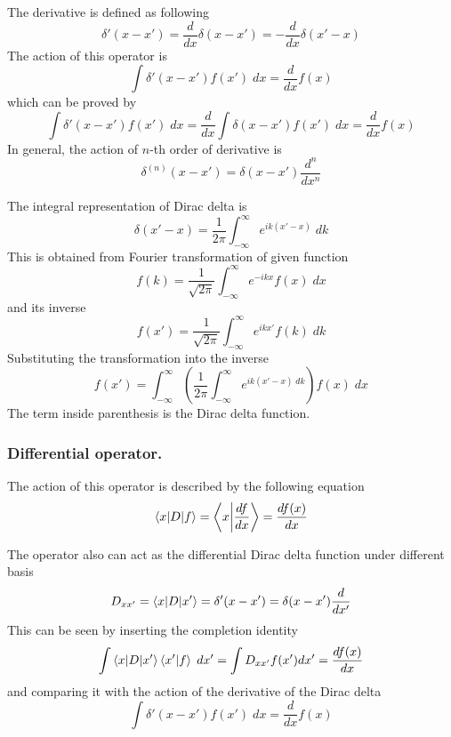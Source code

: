 \documentclass[../main.tex]{subfiles}
\begin{document}
The derivative is defined as following
\begin{equation*}
	\delta'(x-x')=\frac{d }{dx}\delta(x-x')=-\frac{d }{dx}\delta(x'-x)
\end{equation*}
The action of this operator is
\begin{equation*}
	\int\delta'(x-x')f(x')\;dx=\frac{d }{dx} f(x)
\end{equation*}
which can be proved by
\begin{equation*}
	\int\delta'(x-x')f(x')\;dx=\frac{d }{dx }\int\delta(x-x')f(x')\;dx=\frac{d }{dx}f(x)
\end{equation*}
In general, the action of $n$-th order of derivative is
\begin{equation*}
	\delta^{(n)}(x-x')=\delta(x-x')\frac{d^n }{dx^n}
\end{equation*}

The integral representation of Dirac delta is
\begin{equation*}
	\delta(x'-x)=\frac{1 }{2\pi} \int_{-\infty}^{\infty} e^{ik(x'-x)}\;dk
\end{equation*}
This is obtained from Fourier transformation of given function
\begin{equation*}
	f(k)=\frac{1 }{\sqrt{2\pi }}\int_{-\infty}^{\infty} e^{-ikx}f(x)\;dx
\end{equation*}
and its inverse
\begin{equation*}
	f(x')=\frac{1 }{\sqrt{2\pi }}\int_{-\infty}^{\infty} e^{ikx'}f(k)\;dk
\end{equation*}
Substituting the transformation into the inverse
\begin{equation*}
	f(x')=\int_{-\infty}^{\infty} \left(\frac{1 }{2\pi}\int_{-\infty}^{\infty} e^{ik(x'-x)\;dk}\right)f(x)\;dx
\end{equation*}
The term inside parenthesis is the Dirac delta function.

\subsubsection*{Differential operator.}
The action of this operator is described by the following equation
\begin{equation*}
	\braket{x|D|f}=\left\langle x\bigg| \frac{df }{dx}\right\rangle=\frac{df(x)}{dx}
\end{equation*}

The operator also can act as the differential Dirac delta function under different basis
\begin{equation*}
	D_{xx'}=\braket{x|D|x'}=\delta'(x-x')=\delta(x-x')\frac{d }{dx'}
\end{equation*}
This can be seen by inserting the completion identity
\begin{equation*}
	\int \braket{x|D|x'}\braket{x'|f}\;dx'=\int D_{xx'}f(x')dx'=\frac{df(x)}{dx}
\end{equation*}
and comparing it with the action of the derivative of the Dirac delta
\begin{equation*}
	\int\delta'(x-x')f(x')\;dx=\frac{d }{dx} f(x)
\end{equation*}
\end{document}
